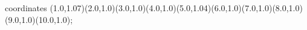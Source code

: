					coordinates { (1.0,1.07)(2.0,1.0)(3.0,1.0)(4.0,1.0)(5.0,1.04)(6.0,1.0)(7.0,1.0)(8.0,1.0)(9.0,1.0)(10.0,1.0)};